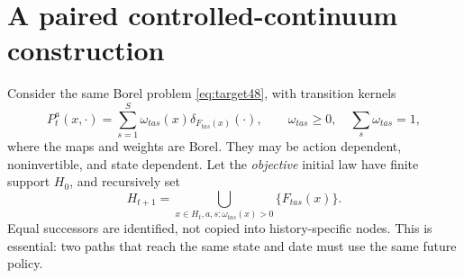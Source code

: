 \section{A paired controlled-continuum construction}\label{sec:continuum48}
Consider the same Borel problem \eqref{eq:target48}, with transition kernels
\begin{equation}\label{eq:atoms48}
 P_t^a(x,\cdot)=\sum_{s=1}^{S}\omega_{tas}(x)\delta_{F_{tas}(x)}(\cdot),
 \qquad \omega_{tas}\ge0,\quad\sum_s\omega_{tas}=1,
\end{equation}
where the maps and weights are Borel. They may be action dependent, noninvertible, and state dependent. Let the \emph{objective} initial law have finite support $H_0$, and recursively set
\begin{equation}\label{eq:closure48}
 H_{t+1}=\bigcup_{x\in H_t,a,s:\omega_{tas}(x)>0}\{F_{tas}(x)\}.
\end{equation}
Equal successors are identified, not copied into history-specific nodes. This is essential: two paths that reach the same state and date must use the same future policy.

